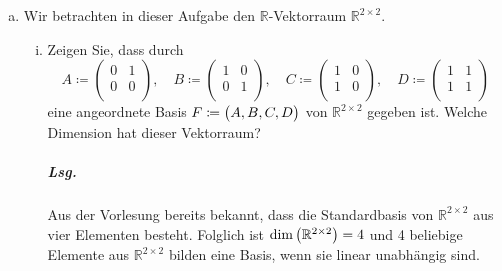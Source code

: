 \documentclass{scrreprt}
\begin{document}
\begin{enumerate}[(a)]
\item Wir betrachten in dieser Aufgabe den $\mathbb{R}$-Vektorraum
  $\mathbb{R}^{2 \times 2}$.
  \begin{enumerate}[(i)]
  \item Zeigen Sie, dass durch
    \label{2_b_1}
    \[
      A \coloneqq \begin{pmatrix}
        0 & 1 \\
        0 & 0 \\
      \end{pmatrix}, \quad
      B \coloneqq \begin{pmatrix}
        1 & 0 \\
        0 & 1 \\
      \end{pmatrix}, \quad
      C \coloneqq \begin{pmatrix}
        1 & 0 \\
        1 & 0 \\
      \end{pmatrix}, \quad
      D \coloneqq \begin{pmatrix}
        1 & 1 \\
        1 & 1 \\
      \end{pmatrix}
    \]
    eine angeordnete Basis $F \coloneqq \qty\big(A, B, C, D)$ von
    $\mathbb{R}^{2 \times 2}$ gegeben ist.
    Welche Dimension hat dieser Vektorraum?

    \subparagraph{Lsg.} Aus der Vorlesung bereits bekannt, dass die Standardbasis
    von $\mathbb{R}^{2 \times 2}$ aus vier Elementen besteht.
    Folglich ist $\dim\qty(\mathbb{R}^{2 \times 2}) = 4$ und 4 beliebige Elemente
    aus $\mathbb{R}^{2 \times 2}$ bilden eine Basis, wenn sie linear unabhängig
    sind.


\end{enumerate}
\end{enumerate}
\end{document}
